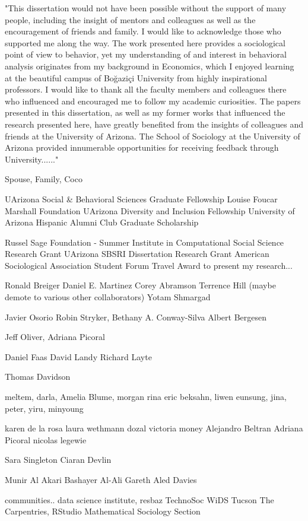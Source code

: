 

"This dissertation would not have been possible without the support of many
people, including the insight of mentors and colleagues as well as the
encouragement of friends and family. I would like to acknowledge those who
supported me along the way. The work presented here provides a sociological
point of view to behavior, yet my understanding of and interest in behavioral
analysis originates from my background in Economics, which I enjoyed learning at
the beautiful campus of Boğaziçi University from highly inspirational
professors. I would like to thank all the faculty members and colleagues there
who influenced and encouraged me to follow my academic curiosities. The papers
presented in this dissertation, as well as my former works that influenced the
research presented here, have greatly benefited from the insights of colleagues
and friends at the University of Arizona. The School of Sociology at the
University of Arizona provided innumerable opportunities for receiving feedback
through University......"

Spouse, Family, Coco

UArizona Social \& Behavioral Sciences Graduate Fellowship
Louise Foucar Marshall Foundation
UArizona Diversity and Inclusion Fellowship
University of Arizona Hispanic Alumni Club Graduate Scholarship 

Russel Sage Foundation - Summer Institute in Computational Social Science Research Grant
UArizona SBSRI Dissertation Research Grant 
American Sociological Association Student Forum Travel Award to present my research...

Ronald Breiger
Daniel E. Martinez
Corey Abramson
Terrence Hill (maybe demote to various other collaborators)
Yotam Shmargad

 Javier Osorio
 Robin Stryker, Bethany A. Conway-Silva
 Albert Bergesen

Jeff Oliver, Adriana Picoral

Daniel Faas
David Landy	
Richard Layte	

Thomas Davidson

meltem, darla, Amelia Blume, morgan
rina
eric
beksahn, liwen
eunsung, jina, peter, yiru, minyoung

karen de la rosa
laura wethmann dozal 
victoria money
Alejandro Beltran
Adriana Picoral
nicolas legewie

 Sara Singleton
 Ciaran Devlin
 
 Munir Al Akari
 Bashayer Al-Ali
 Gareth Aled Davies

communities.. 
data science institute, 
resbaz
TechnoSoc
WiDS Tucson
The Carpentries, RStudio
Mathematical Sociology Section